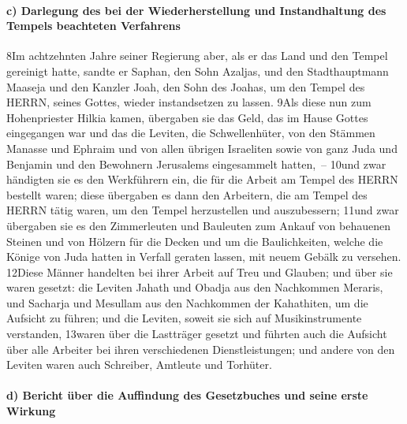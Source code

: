 \hypertarget{c-darlegung-des-bei-der-wiederherstellung-und-instandhaltung-des-tempels-beachteten-verfahrens}{%
\paragraph{c) Darlegung des bei der Wiederherstellung und Instandhaltung
des Tempels beachteten
Verfahrens}\label{c-darlegung-des-bei-der-wiederherstellung-und-instandhaltung-des-tempels-beachteten-verfahrens}}

8Im achtzehnten Jahre seiner Regierung aber, als er das Land und den
Tempel gereinigt hatte, sandte er Saphan, den Sohn Azaljas, und den
Stadthauptmann Maaseja und den Kanzler Joah, den Sohn des Joahas, um den
Tempel des HERRN, seines Gottes, wieder instandsetzen zu lassen. 9Als
diese nun zum Hohenpriester Hilkia kamen, übergaben sie das Geld, das im
Hause Gottes eingegangen war und das die Leviten, die Schwellenhüter,
von den Stämmen Manasse und Ephraim und von allen übrigen Israeliten
sowie von ganz Juda und Benjamin und den Bewohnern Jerusalems
eingesammelt hatten,~-- 10und zwar händigten sie es den Werkführern ein,
die für die Arbeit am Tempel des HERRN bestellt waren; diese übergaben
es dann den Arbeitern, die am Tempel des HERRN tätig waren, um den
Tempel herzustellen und auszubessern; 11und zwar übergaben sie es den
Zimmerleuten und Bauleuten zum Ankauf von behauenen Steinen und von
Hölzern für die Decken und um die Baulichkeiten, welche die Könige von
Juda hatten in Verfall geraten lassen, mit neuem Gebälk zu versehen.
12Diese Männer handelten bei ihrer Arbeit auf Treu und Glauben; und über
sie waren gesetzt: die Leviten Jahath und Obadja aus den Nachkommen
Meraris, und Sacharja und Mesullam aus den Nachkommen der Kahathiten, um
die Aufsicht zu führen; und die Leviten, soweit sie sich auf
Musikinstrumente verstanden, 13waren über die Lastträger gesetzt und
führten auch die Aufsicht über alle Arbeiter bei ihren verschiedenen
Dienstleistungen; und andere von den Leviten waren auch Schreiber,
Amtleute und Torhüter.

\hypertarget{d-bericht-uxfcber-die-auffindung-des-gesetzbuches-und-seine-erste-wirkung}{%
\paragraph{d) Bericht über die Auffindung des Gesetzbuches und seine
erste
Wirkung}\label{d-bericht-uxfcber-die-auffindung-des-gesetzbuches-und-seine-erste-wirkung}}

